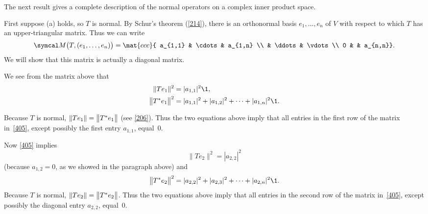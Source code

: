 The next result gives a complete description of the normal operators on a complex inner product space.


\proof
First suppose (a) holds, so $T$ is normal.  By Schur's theorem (\ref{214}), there is an
orthonormal basis $e_1, \dots, e_n$ of $V$ with respect to which $T$ has an
upper-triangular matrix.  Thus we can write
\begin{equation} \label{405}
\M\bigl(T, (e_1, \dots, e_n) \bigr) =
\mat{ccc}{
a_{1,1} & \cdots  & a_{1,n} \\
& \ddots & \vdots\\
0 & & a_{n,n}}.
\end{equation}%
We will show that this matrix is actually a diagonal matrix.


We see from the matrix above that
\begin{align*}
\|Te_1\|^2 &= |a_{1,1}|^2\1, \\
\norm[\big]{T^* e_1}^2 &= |a_{1,1}|^2 +  |a_{1,2}|^2 + \dots +  |a_{1,n}|^2\1.
\end{align*}

Because $T$ is normal, $\norm{Te_1} = \norm[\big]{T^* e_1}$ (see \ref{206}).  Thus the two
equations above imply that all entries in the first row of the matrix in~\ref{405},
except possibly the first entry $a_{1,1}$, equal~$0$.

Now \ref{405} implies
\[
\|Te_2\|^2 = |a_{2,2}|^2
\]
(because $a_{1,2} = 0$, as we showed in the paragraph above) and
\[
\norm[\big]{T^* e_2}^2 = |a_{2,2}|^2 +  |a_{2,3}|^2 + \dots +  |a_{2,n}|^2\1.
\]
Because $T$ is normal, $\|Te_2\| = \norm[\big]{T^* e_2}$.  Thus the two
equations above imply that all entries in the second row of the matrix
in~\ref{405}, except possibly the diagonal entry $a_{2,2}$, equal~$0$.

